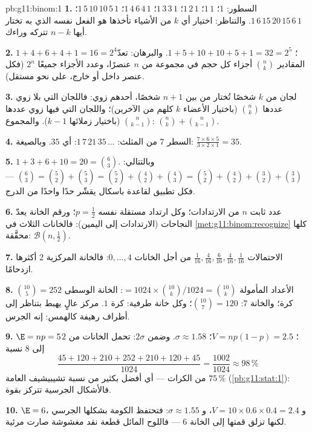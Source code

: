 \begin{solution}{pb:g11:binom:1}
\textbf{1.} السطور: $1$؛ $1\,1$؛ $1\,2\,1$؛ $1\,3\,3\,1$؛
$1\,4\,6\,4\,1$؛ $1\,5\,10\,10\,5\,1$؛
$1\,6\,15\,20\,15\,6\,1$. والتناظر: اختيار أي $k$ من الأشياء
تأخذها هو الفعل نفسه الذي به تختار أيها $n - k$ تتركه
وراءك.

\textbf{2.} $1 + 4 + 6 + 4 + 1 = 16 = 2^4$؛
$1 + 5 + 10 + 10 + 5 + 1 = 32 = 2^5$. والبرهان:
تعدّ المقادير $\binom nk$ أجزاء كل حجم في مجموعة من $n$
عنصرًا، وعدد الأجزاء جميعًا $2^n$ (فكل عنصر داخل
أو خارج، على نحو مستقل).

\textbf{3.} لجان من $k$ شخصًا تُختار من بين $n + 1$ شخصًا، أحدهم
زوي: فاللجان التي بلا زوي عددها $\binom nk$ (باختيار الأعضاء
$k$ كلهم من الآخرين)؛ واللجان التي فيها زوي عددها $\binom{n}{k-1}$
(باختيار زملائها $k - 1$). والمجموع:
$\binom nk + \binom{n}{k-1}$.

\textbf{4.} السطر $7$ من المثلث: $1\,7\,21\,35\,\dots$: أي $35$.
وبالصيغة: $\frac{7 \times 6 \times 5}{3 \times 2 \times 1} =
35$.

\textbf{5.} $1 + 3 + 6 + 10 = 20 = \binom63$. وبالتتالي:
$\binom63 = \binom52 + \binom53 = \binom52 + \binom42 +
\binom43 = \binom52 + \binom42 + \binom32 + \binom33$ ---
فكل تطبيق لقاعدة باسكال يقشّر حدًا واحدًا من
الدرج.

\textbf{6.} عدد ثابت $n$ من الارتدادات؛ وكل ارتداد
 مستقلة  نفسه $p = \frac12$؛ ورقم
الخانة يعدّ النجاحات (الارتدادات إلى اليمين): فالخانات الثلاث
في \cref{met:g11:binom:recognize} كلها محقَّقة:
$\mathcal B\!\left(n, \frac12\right)$.

\textbf{7.} الاحتمالات $\frac{1}{16}, \frac{4}{16},
\frac{6}{16}, \frac{4}{16}, \frac{1}{16}$ من أجل الخانات
$0, \dots, 4$: فالخانة المركزية $2$ أكثرها ازدحامًا.

\textbf{8.} الأعداد المأمولة $= 1024 \times
\binom{10}{k}/1024 = \binom{10}{k}$: الخانة الوسطى
$\binom{10}{5} = 252$ كرة؛ والخانة $7$: $\binom{10}{7} = 120$؛
وكل خانة طرفية: كرة $1$. مركز عالٍ يهبط
بتناظر إلى أطراف رهيفة كالهمس: إنه الجرس.

\textbf{9.} $\E = np = 5$؛ $V = np(1 - p) = 2.5$؛
$\sigma \approx 1.58$. وضمن $2\sigma$: تحمل الخانات من $2$ إلى $8$
نسبة
\[
\frac{45 + 120 + 210 + 252 + 210 + 120 + 45}{1024}
= \frac{1002}{1024} \approx 98\,\%
\]
من الكرات --- أي أفضل بكثير
من نسبة تشيبيشيف العامة $75\,\%$
(\cref{pb:g11:stat:1}): فالأشكال الجرسية تتركز بقوة.

\textbf{10.} $\E = 6$، و $V = 10 \times 0.6 \times 0.4 = 2.4$،
و $\sigma \approx 1.55$: فتحتفظ الكومة بشكلها الجرسي لكنها
تزلق قمتها إلى الخانة $6$ --- فاللوح المائل قطعة نقد
مغشوشة صارت مرئية.


\end{solution}
